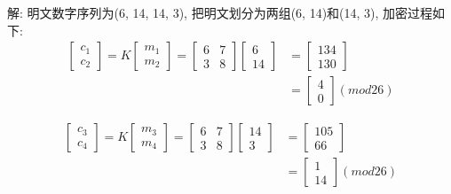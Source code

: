 \documentclass[UTF8]{ctexart}
\begin{document}
\begin{itemize}
\begin{enumerate}
            解: 明文数字序列为(6, 14, 14, 3), 把明文划分为两组(6, 14)和(14, 3), 加密过程如下:
            $$
            \begin{aligned}
                \left[ \begin{array}{c}{c_1}\\ {c_2}\end{array}\right]=K\left[ \begin{array}{c}{m_1}\\ {m_2} \end{array}\right]
                        =\left[ \begin{array}{cc}{6} &{7}\\ {3} &{8} \end{array}\right]\left[\begin{array}{c}{6}\\ {14} \end{array}\right]
                            &=\left[ \begin{array}{c}{134}\\ {130} \end{array}\right]\\
                                &=\left[ \begin{array}{c}{4}\\ {0} \end{array}\right](mod 26)
            \end{aligned}
            $$

            $$
            \begin{aligned}
                \left[ \begin{array}{c}{c_3}\\ {c_4}\end{array}\right]=K\left[ \begin{array}{c}{m_3}\\ {m_4} \end{array}\right]
                        =\left[ \begin{array}{cc}{6} &{7}\\ {3} &{8} \end{array}\right]\left[\begin{array}{c}{14}\\ {3} \end{array}\right]
                            &=\left[ \begin{array}{c}{105}\\ {66} \end{array}\right]\\
                                &=\left[ \begin{array}{c}{1}\\ {14} \end{array}\right](mod 26)
            \end{aligned}
            $$


\end{enumerate}
\end{itemize}
\end{document}
